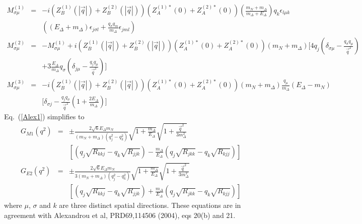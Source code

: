 \documentclass[12pt]{article}
\begin{document}
\begin{eqnarray}
M_{\sigma\mu}^{(1)}
 &=& -i\left(Z_B^{(1)}(|\vec q|)+Z_B^{(2)}(|\vec q|)\right)
     \left(Z_A^{(1)*}(0)+Z_A^{(2)*}(0)\right)
     \left(\frac{m_N+m_\Delta}{m_\Delta+E_\Delta}\right)q_k
     \epsilon_{l\mu k} \nonumber \\
  && \left(
     (E_\Delta+m_\Delta)\epsilon_{j\sigma l}+\frac{q_\sigma q_m}
     {m_\Delta}\epsilon_{jml}\right) \nonumber \\
M_{\sigma\mu}^{(2)} &=& -M_{\sigma\mu}^{(1)}
    + i\left(Z_B^{(1)}(|\vec q|)+Z_B^{(2)}(|\vec q|)\right)
      \left(Z_A^{(1)*}(0)+Z_A^{(2)*}(0)\right)
      (m_N+m_\Delta)\bigg[4q_j\left(\delta_{\sigma\mu}-\frac{q_\sigma q_\mu}
      {\vec q^2}\right) \nonumber \\
   && +3\frac{E_\Delta}{m_\Delta}q_\sigma\left(\delta_{j\mu}
      -\frac{q_jq_\mu}{\vec q^2}\right)\bigg] \nonumber \\
M_{\sigma\mu}^{(3)} &=& -i\left(Z_B^{(1)}(|\vec q|)+Z_B^{(2)}(|\vec q|)\right)
      \left(Z_A^{(1)*}(0)+Z_A^{(2)*}(0)\right)(m_N+m_\Delta)\frac{q_\mu}{m_\Delta}(E_\Delta-m_N) \nonumber \\
   && \bigg[\delta_{\sigma j}-\frac{q_jq_\sigma}{\vec q^2}\left(1+\frac{2E_\Delta}
      {m_\Delta}\right)\bigg] \nonumber
\end{eqnarray}
Eq.~(\ref{Alex1}) simplifies to
\begin{eqnarray}
G_{M1}(q^2) &=& \pm\frac{2\sqrt{6}E_\Delta m_N}{(m_N+m_\Delta)(q_j^2-q_k^2)}
              \sqrt{1+\frac{m_\Delta}{E_\Delta}}
              \sqrt{1+\frac{\vec q^2}{3m_\Delta^2}} \nonumber \\
           && \left[\left(q_j\sqrt{R_{kkj}}-q_k\sqrt{R_{jjk}}\right)
              -\frac{m_\Delta}{E_\Delta}
              \left(q_j\sqrt{R_{jkk}}-q_k\sqrt{R_{kjj}}\right)\right]
 \nonumber \\
G_{E2}(q^2) &=& \pm\frac{2\sqrt{6}E_\Delta m_N}{3(m_N+m_\Delta)(q_j^2-q_k^2)}
              \sqrt{1+\frac{m_\Delta}{E_\Delta}}
              \sqrt{1+\frac{\vec q^2}{3m_\Delta^2}} \nonumber \\
           && \left[\left(q_j\sqrt{R_{kkj}}-q_k\sqrt{R_{jjk}}\right)
              +\frac{m_\Delta}{E_\Delta}
              \left(q_j\sqrt{R_{jkk}}-q_k\sqrt{R_{kjj}}\right)\right]
 \nonumber
\end{eqnarray}
where $\mu$, $\sigma$ and $k$ are three distinct spatial directions.
These equations are in agreement with Alexandrou et al, PRD69,114506 (2004),
eqs 20(b) and 21.

\newpage
\end{document}
